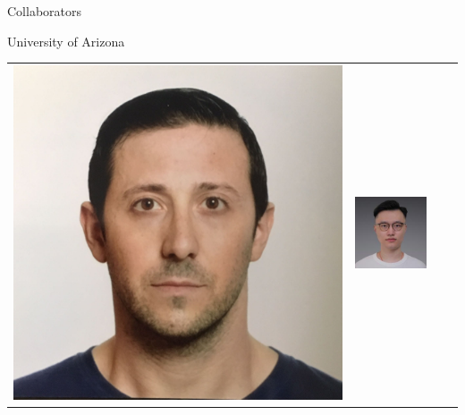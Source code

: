 \documentclass[14pt]{beamer}
\begin{document}
\begin{frame}{Collaborators}
\centering

\begin{block}{University of Arizona}
\begin{tabular}{c c c c }
\includegraphics[height=0.2\textheight]{Egoitz.jpg} &
\includegraphics[height=0.2\textheight]{Xin.jpg} &

\end{tabular}
\end{block}
\end{frame}
\end{document}
